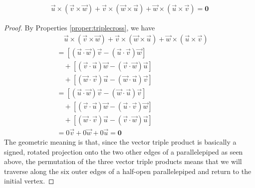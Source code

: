 \begin{proper}
\begin{align}
\vec{u} \times (\vec{v} \times \vec{w}) + \vec{v} \times (\vec{w} \times \vec{u}) + \vec{w} \times (\vec{u} \times \vec{v}) = \textbf{0}    
\end{align}
\end{proper}
\begin{proof}
By Properties \ref{proper:triplecross}, we have
\begin{align*}
&\quad \vec{u} \times (\vec{v} \times \vec{w}) + \vec{v} \times (\vec{w} \times \vec{u}) + \vec{w} \times (\vec{u} \times \vec{v}) \\
&= [(\vec{u} \cdot \vec{w})\vec{v} - (\vec{u} \cdot \vec{v})\vec{w}] \\
&\quad + [(\vec{v} \cdot \vec{u})\vec{w} - (\vec{v} \cdot \vec{w})\vec{u}] \\
&\quad + [(\vec{w} \cdot \vec{v})\vec{u} - (\vec{w} \cdot \vec{u})\vec{v}] \\
&= [(\vec{u} \cdot \vec{w})\vec{v} - (\vec{w} \cdot \vec{u})\vec{v}] \\
&\quad + [(\vec{v} \cdot \vec{u})\vec{w} - (\vec{u} \cdot \vec{v})\vec{w}] \\
&\quad + [(\vec{w} \cdot \vec{v})\vec{u} - (\vec{v} \cdot \vec{w})\vec{u}] \\
&= 0\vec{v} + 0\vec{w} + 0\vec{u} = \textbf{0}
\end{align*}
The geometric meaning is that, since the vector triple product is basically a signed, rotated projection onto the two other edges of a parallelepiped as seen above, the permutation of the three vector triple products means that we will traverse along the six outer edges of a half-open parallelepiped and return to the initial vertex.
\end{proof}

